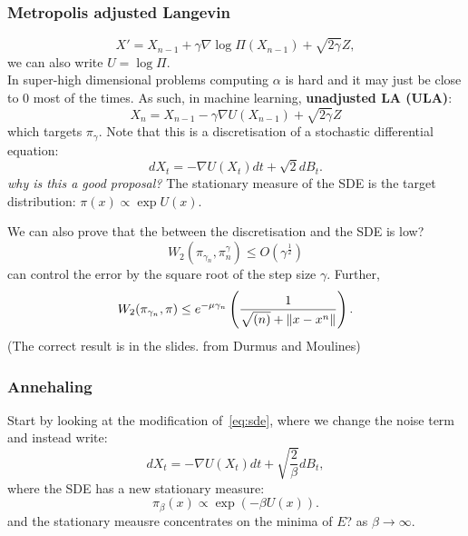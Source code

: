 \documentclass{article}
\DeclarePairedDelimiter{\norm}{\lVert}{\rVert}
\begin{document}
    \subsubsection{Metropolis adjusted Langevin}

    \begin{equation} \label{eq:mala}
      X' = X_{n-1} + \gamma \nabla \log \Pi(X_{n-1}) + \sqrt{2\gamma} Z,
    \end{equation}
    we can also write $U = \log \Pi$.
    \\
    In super-high dimensional problems computing $\alpha$ is hard and it may just be close to 0 most of the times.
    As such, in machine learning, \textbf{unadjusted LA (ULA)}:
    \begin{equation} \label{eq:ula}
        X_n = X_{n-1} - \gamma \nabla U(X_{n-1}) + \sqrt{2\gamma} Z
    \end{equation}
    which targets $\pi_\gamma$.
    Note that this is a discretisation of a stochastic differential equation:
    \begin{equation} \label{eq:sde}
        dX_t = -\nabla U(X_t) dt + \sqrt{2} dB_t.
    \end{equation}
    \textit{why is this a good proposal?} The stationary measure of the SDE is the target distribution: $\pi(x) \propto \exp{U(x)}$.

    We can also prove that the  between the discretisation and the SDE is low?
    \begin{equation} \label{eq:}
        W_2(\pi_{\gamma_n}, \pi_n^\gamma) \leq O(\gamma^{\frac{1}{2}})
    \end{equation}
    can control the error by the square root of the step size $\gamma$.
    Further, 
    \begin{equation} \label{eq:}
        W_2(\pi_{\gamma_n}, \pi) \leq e^{-\mu\gamma_n} \left( \frac{1}{\sqrt{(n)} + \norm{x-x^n}} \right).
    \end{equation}
    (The correct result is in the slides. from Durmus and Moulines)

    \subsubsection{Annehaling}

    Start by looking at the modification of~\cref{eq:sde}, where we change the noise term and instead write:
    \begin{equation} \label{eq:}
        dX_t = -\nabla U(X_t) dt + \sqrt{\frac{2}{\beta}} dB_t,
    \end{equation}
    where the SDE has a new stationary measure:
    \begin{equation} \label{eq:}
        \pi_\beta(x) \propto \exp(-\beta U(x)).
    \end{equation}
    and the stationary meausre concentrates on the minima of $E$? as $\beta \rightarrow \infty$.
    
\end{document}
